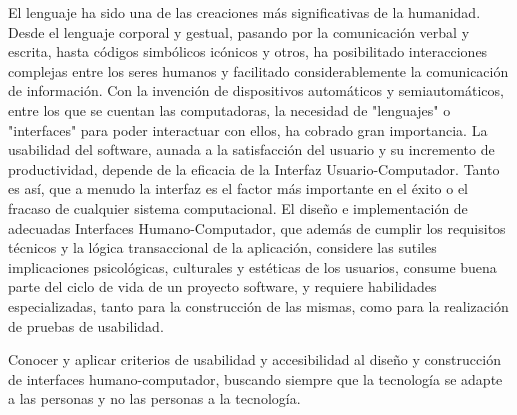\begin{syllabus}


\begin{justification}
El lenguaje ha sido una de las creaciones más significativas de la humanidad. Desde el lenguaje corporal y gestual, pasando por la comunicación verbal y escrita, hasta códigos simbólicos icónicos y otros, ha posibilitado interacciones complejas entre los seres humanos y facilitado considerablemente la comunicación de información. Con la invención de dispositivos automáticos y semiautomáticos, entre los que se cuentan las computadoras, la necesidad de "lenguajes" o "interfaces" para poder interactuar con ellos, ha cobrado gran importancia.
La usabilidad del software, aunada a la satisfacción del usuario y su incremento de productividad, depende de la eficacia de la Interfaz Usuario-Computador. Tanto es así, que a menudo la interfaz es el factor más importante en el éxito o el fracaso de cualquier sistema computacional.
El diseño e implementación de adecuadas Interfaces Humano-Computador, que además de cumplir los requisitos técnicos y la lógica transaccional de la aplicación, considere las sutiles implicaciones psicológicas, culturales y estéticas de los usuarios, consume buena parte del ciclo de vida de un proyecto software, y requiere habilidades especializadas, tanto para la construcción de las mismas, como para la realización de pruebas de usabilidad.
\end{justification}

\begin{goals}
\item Conocer y aplicar criterios de usabilidad y accesibilidad al diseño y construcción de interfaces humano-computador, buscando siempre que la tecnología se adapte a las personas y no las personas a la tecnología.
\end{goals}

\begin{outcomes}
\end{outcomes}


\end{syllabus}
